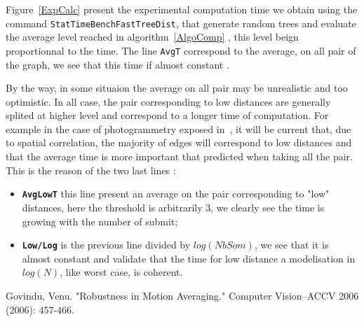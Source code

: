 \documentclass[a4paper]{article}
\begin{document}
Figure~\ref{ExpCalc} present the experimental computation time we obtain using the 
command {\tt StatTimeBenchFastTreeDist}, that generate random trees and evaluate
the average level reached in algorithm~\ref{AlgoComp} , this level beign proportionnal to the time.
The line {\tt AvgT}  correspond to the average, on all pair of the graph, 
we see that this time if almost constant .

By the way, in some situaion the average on all pair may be unrealistic and too optimistic.
In all case, the pair corresponding to low distances are generally splited at higher level
and correspond to a longer time of computation.
For example in the case  of photogrammetry exposed in~\cite{Govin2006}, it will be current
that, due to spatial correlation, the majority of edges will correspond to low distances and
that the average time is more important that predicted when taking all the pair.
This is the reason of the two last lines :

\begin{itemize}
    \item {\tt \bf  AvgLowT}  this line present an average on the pair corresponding to "low" distances,
         here the threshold is arbitrarily $3$, we clearly see the time is growing with the number of submit;

    \item {\tt \bf  Low/Log}  is the previous line divided by $log(NbSom)$, we see that it is almost constant
          and validate that the time for low distance a modelisation in $log(N)$, like worst case, is coherent.
\end{itemize}


\begin{thebibliography}{References}
          Govindu, Venu. "Robustness in Motion Averaging." Computer Vision–ACCV 2006 (2006): 457-466.
\end{thebibliography}
\end{document}
